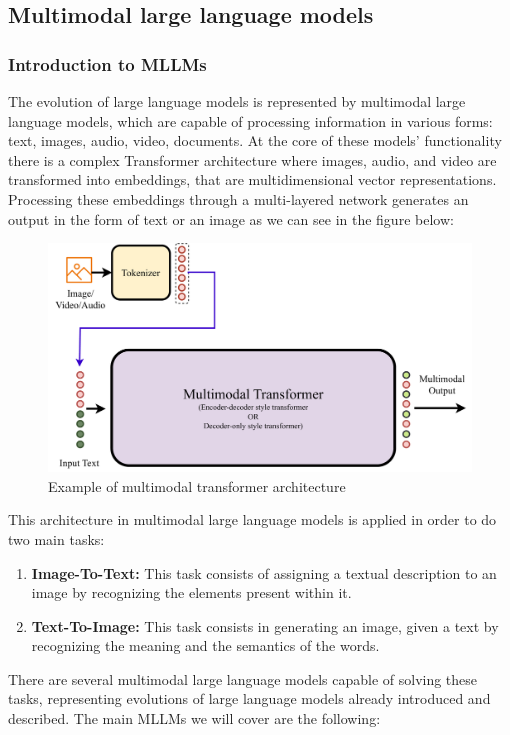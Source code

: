\newpage
\subsection{Multimodal large language models}
\subsubsection{Introduction to MLLMs}
The evolution of large language models is represented by multimodal large language models, which are capable of processing information in various forms: text, images, audio, video, documents. At the core of these models’ functionality there is a complex Transformer architecture where images, audio, and video are transformed into embeddings, that are multidimensional vector representations. Processing these embeddings through a multi-layered network generates an output in the form of text or an image\cite{wadekar2024evolution} as we can see in the figure below: 
\begin{figure}[H]
    \centering
    \includegraphics[width=0.9\linewidth]{Figures/fig_21.png}
    \caption{Example of multimodal transformer architecture}
    \label{fig:enter-label}
\end{figure}
This architecture in multimodal large language models is applied in order to do two main tasks:
\begin{enumerate}
    \item \textbf{Image-To-Text:} This task consists of assigning a textual description to an image by recognizing the elements present within it.


    \item \textbf{Text-To-Image:} This task consists in generating an image, given a text by recognizing the meaning and the semantics of the words.
\end{enumerate}
There are several multimodal large language models capable of solving these tasks, representing evolutions of large language models already introduced and described. The main MLLMs we will cover are the following:

